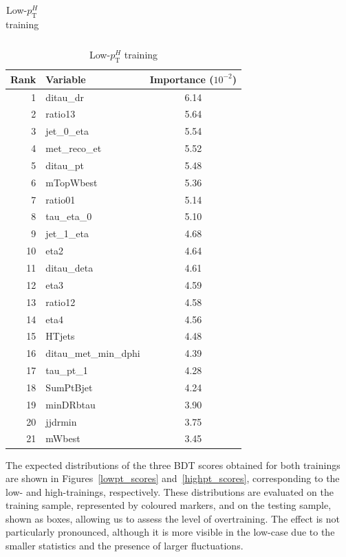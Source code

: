 \begin{table}[h]
\begin{subtable}[t]{0.48\textwidth}
\begin{tabular}{r l c}
      \bottomrule
    \end{tabular}
    \caption{High-$p_{\mathrm{T}}^{H}$ training}
  \end{subtable}%
  \hfill
  \begin{subtable}[t]{0.48\textwidth}
    \centering
    \begin{tabular}{r l c}
      \toprule
      \textbf{Rank} & \textbf{Variable} & \textbf{Importance} ($10^{-2}$) \\
      \midrule
       1 & ditau\_dr             & 6.14 \\
       2 & ratio13               & 5.64 \\
       3 & jet\_0\_eta           & 5.54 \\
       4 & met\_reco\_et         & 5.52 \\
       5 & ditau\_pt             & 5.48 \\
       6 & mTopWbest             & 5.36 \\
       7 & ratio01               & 5.14 \\
       8 & tau\_eta\_0           & 5.10 \\
       9 & jet\_1\_eta           & 4.68 \\
      10 & eta2                  & 4.64 \\
      11 & ditau\_deta           & 4.61 \\
      12 & eta3                  & 4.59 \\
      13 & ratio12               & 4.58 \\
      14 & eta4                  & 4.56 \\
      15 & HTjets                & 4.48 \\
      16 & ditau\_met\_min\_dphi & 4.39 \\
      17 & tau\_pt\_1            & 4.28 \\
      18 & SumPtBjet             & 4.24 \\
      19 & minDRbtau             & 3.90 \\
      20 & jjdrmin              & 3.75 \\
      21 & mWbest                & 3.45 \\
      \bottomrule
    \end{tabular}
    \caption{Low-$p_{\mathrm{T}}^{H}$ training}
  \end{subtable}
  \label{tab:bdt_importance_high_low}
\end{table}

The expected distributions of the three BDT scores obtained for both trainings are shown in Figures~\ref{lowpt_scores} and~\ref{highpt_scores}, corresponding to the low- and high-\pth trainings, respectively. These distributions are evaluated on the training sample, represented by coloured markers, and on the testing sample, shown as boxes, allowing us to assess the level of overtraining. The effect is not particularly pronounced, although it is more visible in the low-\pth case due to the smaller statistics and the presence of larger fluctuations.  


